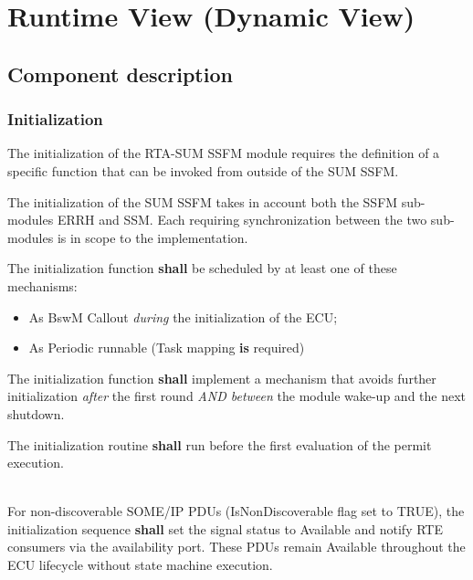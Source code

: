 \chapter{Runtime View (Dynamic View)}

\section{Component description}

\subsection{Initialization}
\label{sec:InitDynamic}

The initialization of the RTA-SUM SSFM module requires the definition of a specific function  that can be invoked from outside of the SUM SSFM.

The initialization of the SUM SSFM takes in account both the SSFM sub-modules ERRH and SSM. Each requiring synchronization between the two sub-modules is in scope to the implementation.

The initialization function \textbf{shall} be scheduled by at least one of these mechanisms:
\begin{itemize}
    \item As BswM Callout \textit{during} the initialization of the ECU;
    \item As Periodic runnable (Task mapping \textbf{is} required)
\end{itemize}

The initialization function \textbf{shall} implement a mechanism that avoids further initialization \textit{after} the first round \textit{AND between} the module wake-up and the next shutdown. 

The initialization routine \textbf{shall} run before the first evaluation of the permit execution.
{}

\\
For non-discoverable SOME/IP PDUs (IsNonDiscoverable flag set to TRUE), the initialization sequence \textbf{shall} set the signal status to Available and notify RTE consumers via the availability port. These PDUs remain Available throughout the ECU lifecycle without state machine execution.
\\
{ }
